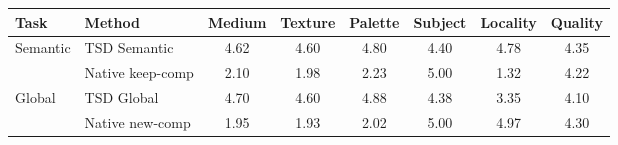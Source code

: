\begin{tabular}{llcccccc}
\toprule
Task & Method & Medium & Texture & Palette & Subject & Locality & Quality \\
\midrule
Semantic & TSD Semantic & 4.62 & 4.60 & 4.80 & 4.40 & 4.78 & 4.35 \\
 & Native keep-comp & 2.10 & 1.98 & 2.23 & 5.00 & 1.32 & 4.22 \\
\midrule
Global & TSD Global & 4.70 & 4.60 & 4.88 & 4.38 & 3.35 & 4.10 \\
 & Native new-comp & 1.95 & 1.93 & 2.02 & 5.00 & 4.97 & 4.30 \\
\bottomrule
\end{tabular}
